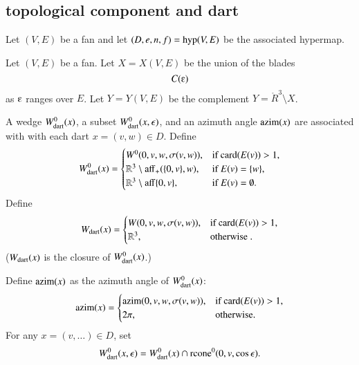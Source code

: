 \subsection{topological component and dart}

Let $(V,E)$ be a fan and let $(D,e,n,f) = {\operatorname{hyp}}(V,E)$
be the associated hypermap.  

\begin{definition}[X,~Y]\label{def:XY}
Let $(V,E)$ be a fan.  Let $X=X(V,E)$ be the union of the
blades
   $$C(\e)$$
as $\e$ ranges over $E$.  Let $Y=Y(V,E)$ be the complement
$Y = \ring{R}^3\setminus X$.
\end{definition}


A wedge $W^0_{\text{dart}}(x)$, a subset $W^0_{\text{dart}}(x,\epsilon)$,
and an azimuth angle ${\operatorname{azim}}(x)$ are associated with
with each dart $x=(v,w)\in D$.  Define 
$$
W^0_{\text{dart}}(x)=
\begin{cases} 
W^0(0,v,w,\sigma(v,w)),&\text{if }{\operatorname{card}}(E(v))>1,\\
\mathbb{R}^3\setminus {\operatorname{aff}}_+(\{0,v\},w),&\text{if } E(v) = \{w\},\\
\mathbb{R}^3\setminus {\operatorname{aff}}\{0,v\},&\text{if } E(v) = \emptyset.\\
\end{cases}
$$
Define
$$
W_{\text{dart}}(x) = 
\begin{cases} 
W(0,v,w,\sigma(v,w)),&\text{if }{\operatorname{card}}(E(v))>1,\\
\mathbb{R}^3,&\text{otherwise }.\\
\end{cases}
$$
($W_{\text{dart}}(x)$ is the closure of $W^0_{\text{dart}}(x)$.)


Define ${\operatorname{azim}}(x)$ as the azimuth angle of $W^0_{\text{dart}}(x)$:
$$
{\operatorname{azim}}(x)=\begin{cases}
{\operatorname{azim}}(0,v,w,\sigma(v,w)), &\text{if } {\operatorname{card}}(E(v)) > 1,\\
2\pi, & \text{otherwise.}\\
\end{cases}
$$
For any $x = (v,\ldots)\in D$, set
    $$
    W^0_{\text{dart}}(x,\epsilon) = W^0_{\text{dart}}(x) \cap {\operatorname{rcone}}^0(0,v,\cos\epsilon).
    $$

